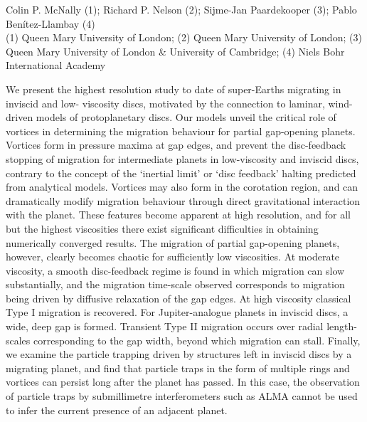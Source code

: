 \documentclass[a4paper,11pt]{book}
\begin{document}
\begin{center}
    
{\large Colin P. McNally (1)};{ \large  Richard P. Nelson (2)};{ \large  Sijme-Jan Paardekooper (3)};{ \large  Pablo Benítez-Llambay (4)}\\
  
\vspace{2 mm}
\noindent (1) Queen Mary University of London; (2)  Queen Mary University of London; (3)  Queen Mary University of London \& University of Cambridge; (4)  Niels Bohr International Academy \\

\end{center}



  
\vspace{2 mm}
\noindent We present the highest resolution study to date of super-Earths migrating in inviscid and low- viscosity discs, motivated by the connection to laminar, wind-driven models of protoplanetary discs. Our models unveil the critical role of vortices in determining the migration behaviour for partial gap-opening planets. Vortices form in pressure maxima at gap edges, and prevent the disc-feedback stopping of migration for intermediate planets in low-viscosity and inviscid discs, contrary to the concept of the ‘inertial limit’ or ‘disc feedback’ halting predicted from analytical models. Vortices may also form in the corotation region, and can dramatically modify migration behaviour through direct gravitational interaction with the planet. These features become apparent at high resolution, and for all but the highest viscosities there exist significant difficulties in obtaining numerically converged results. The migration of partial gap-opening planets, however, clearly becomes chaotic for sufficiently low viscosities. At moderate viscosity, a smooth disc-feedback regime is found in which migration can slow substantially, and the migration time-scale observed corresponds to migration being driven by diffusive relaxation of the gap edges. At high viscosity classical Type I migration is recovered. For Jupiter-analogue planets in inviscid discs, a wide, deep gap is formed. Transient Type II migration occurs over radial length-scales corresponding to the gap width, beyond which migration can stall. Finally, we examine the particle trapping driven by structures left in inviscid discs by a migrating planet, and find that particle traps in the form of multiple rings and vortices can persist long after the planet has passed. In this case, the observation of particle traps by submillimetre interferometers such as ALMA cannot be used to infer the current presence of an adjacent planet. 
\end{document}
